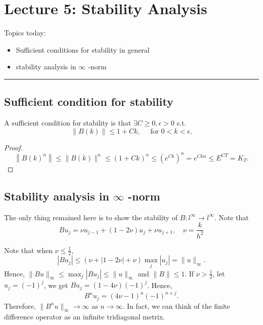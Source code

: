 \newpage 
\section{Lecture 5: Stability Analysis}  
Topics today: 
\begin{itemize}
    \item Sufficient conditions for stability in general 
    \item stability analysis in $ \infty $ -norm 
\end{itemize}

\vspace{1em}
\hrule 
\vspace{1em}
\subsection{Sufficient condition for stability} 

\begin{proposition}
\label{prop: Sufficient stability}
A sufficient condition for stability is that $ \exists C\ge 0, \epsilon >0 $ s.t. 
\[
    \|B(k)\|\le 1+ Ck, \quad \text{  for } 0<k<\epsilon. 
\] 
\end{proposition}
\begin{proof}
\[
    \left\|B(k)^n\right\| \leqslant\|B(k)\|^n \leqslant(1+C k)^n \le (e^{Ck})^n =e^{Ckn} \le E^{CT} = K_T. 
\]
\end{proof}

\subsection{Stability analysis in $ \infty $ -norm } 
The only thing remained here is to show the stability of $B: l^\infty\to l^\infty$. Note that 
\[
    B {u_j} = \nu u_{j-1} + (1-2\nu) u_j + \nu u_{j+1}, \quad \nu = \frac{k}{h^2}
\]

Note that when $\nu\le \frac{1}{2}$, 
\[
    |B u_j| \le (\nu + |1-2\nu| + \nu) \max_j |u_j| = \|u\|_\infty. 
\]
Hence, $\|Bu\|_\infty \le \max_j |Bu_j| \le \|u\|_\infty$ and $\|B\|\le 1$.  If $\nu >\frac{1}{2}$, let $u_j = (-1)^j$, we get $Bu_j  = (1-4\nu) (-1)^j$. Hence, 
\[
    B^n u_j = (4\nu -1)^n (-1)^{n+j}.  
\]
Therefore, $\|B^n u\|_\infty \to \infty$ as $n\to \infty$.  In fact, we can think of the finite difference operator as an infinite tridiagonal metrix. 

